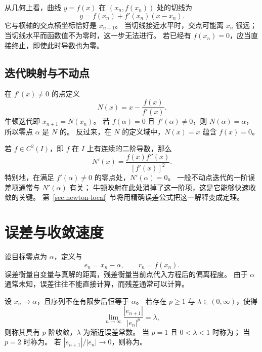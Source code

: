 \documentclass{ctexart}
\begin{document}
从几何上看，曲线 $y=f(x)$ 在 $(x_n,f(x_n))$ 处的切线为
\[
  y=f(x_n)+f'(x_n)(x-x_n).
\]
它与横轴的交点横坐标恰好是 $x_{n+1}$。
当切线接近水平时，交点可能离 $x_n$ 很远；当切线水平而函数值不为零时，这一步无法进行。
若已经有 $f(x_n)=0$，应当直接终止，即使此时导数也为零。

\subsection{迭代映射与不动点}

在 $f'(x)\ne0$ 的点定义
\begin{equation}\label{eq:newton-map}
  N(x)=x-\frac{f(x)}{f'(x)}.
\end{equation}
牛顿迭代即 $x_{n+1}=N(x_n)$。
若 $f(\alpha)=0$ 且 $f'(\alpha)\ne0$，则 $N(\alpha)=\alpha$，
所以零点 $\alpha$ 是 $N$ 的。
反过来，在 $N$ 的定义域中，$N(x)=x$ 蕴含 $f(x)=0$。

若 $f\in C^2(I)$，即 $f$ 在 $I$ 上有连续的二阶导数，那么
\begin{equation}\label{eq:newton-map-derivative}
  N'(x)=\frac{f(x)f''(x)}{[f'(x)]^2}.
\end{equation}
特别地，在满足 $f'(\alpha)\ne0$ 的零点处，$N'(\alpha)=0$。
一般不动点迭代的一阶误差项通常与 $N'(\alpha)$ 有关；
牛顿映射在此处消掉了这一阶项，这是它能够快速收敛的关键。
第~\ref{sec:newton-local} 节将用精确误差公式把这一解释变成定理。

\section{误差与收敛速度}
\label{sec:newton-order}

设目标零点为 $\alpha$，定义与
\[
  e_n=x_n-\alpha,\qquad r_n=f(x_n).
\]
误差衡量自变量与真解的距离，残差衡量当前点代入方程后的偏离程度。
由于 $\alpha$ 通常未知，误差往往不能直接计算，而残差通常可以计算。

\begin{definition}[收敛阶]\label{def:newton-order}
设 $x_n\to\alpha$，且序列不在有限步后恒等于 $\alpha$。
若存在 $p\ge1$ 与 $\lambda\in(0,\infty)$，使得
\[
  \lim_{n\to\infty}\frac{|e_{n+1}|}{|e_n|^p}=\lambda,
\]
则称其具有 $p$ 阶收敛，$\lambda$ 为渐近误差常数。
当 $p=1$ 且 $0<\lambda<1$ 时称为；
当 $p=2$ 时称为。
若 $|e_{n+1}|/|e_n|\to0$，则称为。
\end{definition}
\end{document}
